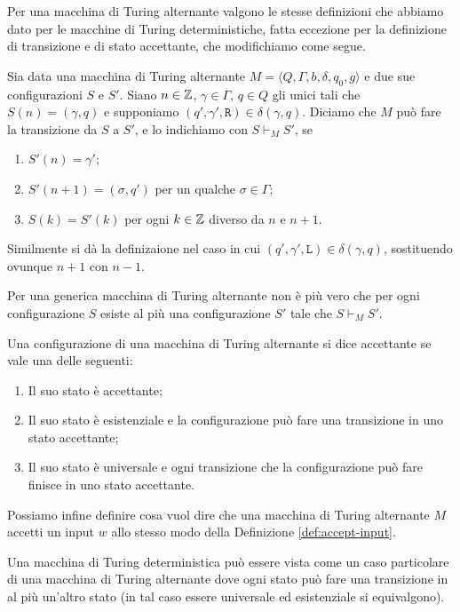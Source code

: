Per una macchina di Turing alternante valgono le stesse definizioni che
abbiamo dato per le macchine di Turing deterministiche, 
fatta eccezione per la definizione di transizione e di stato accettante, che
modifichiamo come segue.
\begin{definizione}
 Sia data una macchina di Turing alternante $M=\langle Q, \Gamma, b, \delta, q_0, g \rangle$
 e due sue configurazioni $S$ e $S'$.
 Siano $n \in \mathbb{Z}$, $\gamma \in \Gamma$, $q \in Q$ gli unici tali che
 $S(n) = (\gamma, q)$ e supponiamo $(q', \gamma', \texttt{R}) \in \delta(\gamma, q)$.
 Diciamo che  $M$ può fare la transizione da $S$ a $S'$, e lo indichiamo con
 $S \vdash_M S'$, se 
 \begin{enumerate}
  \item $S'(n)=\gamma'$;
  \item $S'(n+1)=(\sigma, q')$ per un
 qualche $\sigma \in \Gamma$;
  \item $S(k) = S'(k)$ per ogni $k \in \mathbb{Z}$ diverso da
 $n$ e $n+1$.
 \end{enumerate}
 Similmente si dà la definizaione nel caso in cui
 $(q', \gamma', \texttt{L}) \in \delta(\gamma, q)$,
 sostituendo ovunque $n+1$ con $n-1$.
\end{definizione}

\begin{osservazione}
 Per una generica macchina di Turing alternante non è più vero che per ogni
 configurazione $S$ esiste al più una configurazione $S'$ tale che $S \vdash_M S'$.
\end{osservazione}

\begin{definizione}
 Una configurazione di una macchina di Turing alternante si dice accettante se
 vale una delle seguenti:
 \begin{enumerate}
  \item Il suo stato è accettante;
  \item Il suo stato è esistenziale e la configurazione può fare una transizione
  in uno stato accettante;
  \item Il suo stato è universale e ogni transizione che la configurazione può fare
  finisce in uno stato accettante.
 \end{enumerate}
\end{definizione}
Possiamo infine definire cosa vuol dire che una macchina di Turing alternante
$M$ accetti un input $w$ allo stesso modo della Definizione \ref{def:accept-input}.

\begin{osservazione}
 Una macchina di Turing deterministica può essere vista come un caso particolare
 di una macchina di Turing alternante dove ogni stato può fare una transizione
 in al più un'altro stato (in tal caso essere universale
 ed esistenziale si equivalgono).
\end{osservazione}


